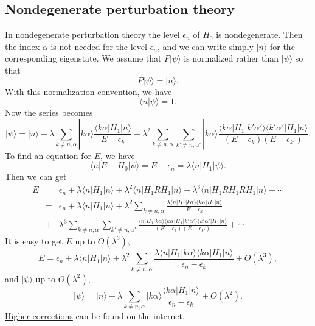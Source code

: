 \subsection{Nondegenerate perturbation theory}
In nondegenerate perturbation theory the level $\epsilon_n$ of $H_0$ is nondegenerate. Then the index $\alpha$ is not needed for the level $\epsilon_n$, and we can write simply $|n\rangle$ for the corresponding eigenstate. We assume that $P|\psi\rangle$ is normalized rather than $|\psi\rangle$ so that
\[P|\psi\rangle  = |n\rangle.\]
With this normalization convention, we have
\[\langle n | \psi \rangle = 1.\]
Now the series becomes
\[|\psi\rangle = |n\rangle + \lambda \sum_{k\neq n,\alpha} |k\alpha\rangle \frac{\langle k\alpha | H_1 | n \rangle}{E-\epsilon_k} + \lambda^2 \sum_{k\neq n,\alpha} \sum_{k'\neq n,\alpha'} |k\alpha\rangle \frac{\langle k\alpha | H_1 | k'\alpha' \rangle \langle k'\alpha' | H_1 | n \rangle}{(E-\epsilon_k)(E-\epsilon_{k'})}.\]
To find an equation for $E$, we have
\[\langle n | E-H_0 | \psi\rangle = E-\epsilon_n = \lambda \langle n | H_1 | \psi\rangle.\]
Then we can get
\begin{eqnarray}
E &=& \epsilon_n + \lambda \langle n | H_1 | n\rangle + \lambda^2 \langle n | H_1RH_1 | n\rangle + \lambda^3 \langle n | H_1RH_1RH_1 | n\rangle + \cdots \nonumber \\
&=& \epsilon_n 
+ \lambda \langle n | H_1|n\rangle 
+ \lambda^2 \sum_{k\neq n,\alpha}  \frac{\lambda \langle n | H_1|k\alpha\rangle \langle k\alpha | H_1 | n \rangle}{E-\epsilon_k} \nonumber \\
&+& \lambda^3 \sum_{k\neq n,\alpha} \sum_{k'\neq n,\alpha'} \frac{\langle n | H_1 |k\alpha\rangle \langle k\alpha | H_1 | k'\alpha' \rangle \langle k'\alpha' | H_1 | n \rangle}{(E-\epsilon_k)(E-\epsilon_{k'})} + \cdots \nonumber
\end{eqnarray}
It is easy to get $E$ up to $O(\lambda^3)$,
\[E = \epsilon_n  + \lambda \langle n | H_1|n\rangle  + \lambda^2 \sum_{k\neq n,\alpha}  \frac{\lambda \langle n | H_1|k\alpha\rangle \langle k\alpha | H_1 | n \rangle}{\epsilon_n-\epsilon_k} + O(\lambda^3),\]
and $|\psi\rangle$ up to $O(\lambda^2)$,
\[|\psi\rangle = |n\rangle + \lambda \sum_{k\neq n,\alpha} |k\alpha\rangle \frac{\langle k\alpha | H_1 | n \rangle}{\epsilon_n-\epsilon_k} + O(\lambda^2).\]
\href{https://en.wikipedia.org/wiki/Perturbation_theory_(quantum_mechanics)#Second-order_and_higher_corrections}{Higher corrections} can be found on the internet.


